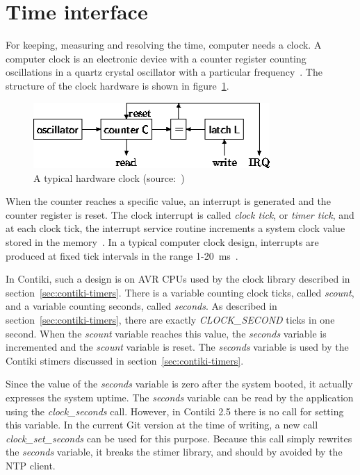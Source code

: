 
\section{Time interface}\label{sec:analysis-time}
For keeping, measuring and resolving the time, computer needs a clock.
A computer clock is an electronic device with a counter register counting oscillations in a
quartz crystal oscillator with a particular frequency~\cite{thesis-sync}.
The structure of the clock hardware is shown in figure~\ref{fig:system-hardware-clock}.
\begin{figure}
  \centering
  \includegraphics[width=9cm,keepaspectratio]{fig/pc-clock.png}
  \caption{A typical hardware clock (source:~\cite{thesis-beat})}
  \label{fig:system-hardware-clock}
\end{figure}
When the counter reaches a specific value, an interrupt is generated and the counter register is reset.
The clock interrupt is called {\it{clock tick}}, or {\it{timer tick}}, and at each clock tick,
the interrupt service routine increments a system clock value stored in the memory~\cite{thesis-sync}.
In a typical computer clock design, interrupts are produced at
fixed tick intervals in the range 1-20~ms~\cite{nanokernel}.

In Contiki, such a design is on AVR CPUs used by the clock library described in section~\ref{sec:contiki-timers}.
There is a variable counting clock ticks, called {\it{scount}},
and a variable counting seconds, called {\it{seconds}}.
As described in section~\ref{sec:contiki-timers}, there are
exactly {\it{CLOCK\_SECOND}} ticks in one second.
When the {\it{scount}} variable reaches this value,
the {\it{seconds}} variable is incremented and the {\it{scount}} variable is reset.
The {\it{seconds}} variable is used by the Contiki stimers discussed in section~\ref{sec:contiki-timers}.

Since the value of the {\it{seconds}} variable is zero after the system booted,
it actually expresses the system uptime.
The {\it{seconds}} variable can be read by the application using the {\it{clock\_seconds}} call.
However, in Contiki 2.5 there is no call for setting this variable.
In the current Git version at the time of writing, a new call {\it{clock\_set\_seconds}}
can be used for this purpose.
Because this call simply rewrites the {\it{seconds}} variable, it breaks the stimer library,
and should by avoided by the NTP client.

